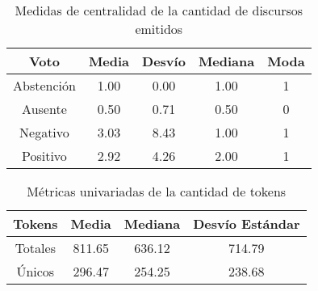 \begin{table}[ht]
\centering
\begin{tabular}{ |c|c|c|c|c| }
    \hline
    Voto & Media & Desvío & Mediana & Moda \\
    \hline\hline
    Abstención & 1.00 & 0.00 & 1.00 & 1 \\
    \hline
    Ausente & 0.50 & 0.71 & 0.50 & 0 \\
    \hline
    Negativo & 3.03 & 8.43 & 1.00 & 1 \\
    \hline
    Positivo & 2.92 & 4.26 & 2.00 & 1 \\
    \hline
\end{tabular}
\caption{Medidas de centralidad de la cantidad de discursos emitidos}
\label{table-tokens}
\end{table}

%
%
%    
\begin{table}[h!]
\begin{center}
\begin{tabular}{ |c|c|c|c| }
\hline
Tokens & Media & Mediana & Desvío Estándar \\
\hline\hline
Totales & 811.65 & 636.12 & 714.79 \\
\hline
Únicos & 296.47 & 254.25 & 238.68 \\
\hline
\end{tabular}
\caption{M\'etricas univariadas de la cantidad de tokens}
\label{table-tokens}
\end{center}
\end{table}
